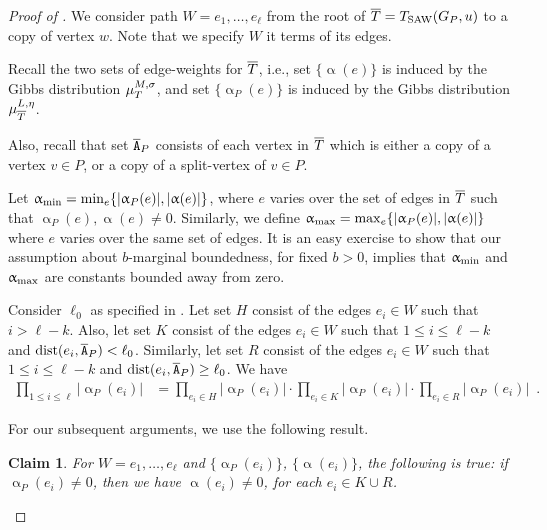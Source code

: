 \documentclass[11pt,reqno]{amsart}
\numberwithin{equation}{section}
\newtheorem{claim}[theorem]{Claim}
\newcommand{\applegreen}[1]{ {\color{applegreen}#1}}
\newcommand{\blue}[1]{{\color{blue}#1}}
\newcommand{\bluepigment}[1]{{\color{blue(pigment)}#1}}
\newcommand{\capri}[1]{{\color{capri}#1}}
\newcommand{\cadmiumorange}[1]{{\color{cadmiumorange}#1}}
\newcommand{\electricviolet}[1]{{\color{electricviolet}#1}}
\newcommand{\goldenbrown}[1]{{\color{goldenbrown}#1}}
\newcommand{\red}[1]{{\color{red}#1}}
\newcommand{\dist}{{\rm dist}}
\newcommand{\Tsaw}{T_{\rm SAW}}
\newcommand{\abs}[1]{\blue{|}#1\blue{|}}
\renewcommand{\applegreen}[1]{#1}
\renewcommand{\blue}[1]{#1}
\renewcommand{\bluepigment}[1]{#1}
\renewcommand{\capri}[1]{#1}
\renewcommand{\cadmiumorange}[1]{#1}
\renewcommand{\electricviolet}[1]{#1}
\renewcommand{\goldenbrown}[1]{#1}
\renewcommand{\red}[1]{#1}
\newcommand{\ke}{\blue{e}}
\newcommand{\ki}{\capri{i}}
\newcommand{\kK}{\bluepigment{K}}
\newcommand{\kk}{\bluepigment{k}}
\newcommand{\kL}{\cadmiumorange{L}}
\newcommand{\kell}{{\color{green(pigment)}\ell}}%
\newcommand{\kP}{\goldenbrown{P}}
\newcommand{\ku}{\red{u}}
\newcommand{\kv}{\electricviolet{v}}
\newcommand{\kW}{\blue{W}}
\newcommand{\kw}{\blue{w}}
\renewcommand{\ke}{e}
\renewcommand{\ki}{i}
\renewcommand{\kK}{K}
\renewcommand{\kk}{k}
\renewcommand{\kL}{L}
\renewcommand{\kell}{\ell}
\renewcommand{\kP}{P}
\renewcommand{\ku}{u}
\renewcommand{\kv}{v}
\renewcommand{\kW}{W}
\renewcommand{\kw}{w}
\newcommand{\infweight}{\upalpha}
\begin{document}
\begin{proof}[Proof of ]
We consider path $\kW=\ke_1,\ldots, \ke_{\kell}$ from the root of $\SMTPu=\Tsaw(\gext{G}{\kP}, \ku)$ to a copy of vertex $\kw$.
Note that we specify $\kW$ it terms of its edges. 


Recall  the two sets of edge-weights for $\overline{T}$, i.e., set  $\{\infweight(\ke)\}$ is induced by the Gibbs distribution $\mu^{M,\sigma}_{\SMTu}$, 
 and set $\{ \infweight_{\kP}(\ke)\}$ is induced by the Gibbs distribution $\mu^{\kL,\eta}_{\SMTPu}$. 



Also, recall that set $\cpTP$ consists of each vertex in $\overline{T}$  which is either a copy of a vertex 
$\kv\in \kP$, or a copy of a split-vertex of $\kv\in \kP$. 
 


Let $\infweight_{\rm min}=\min_{\ke}\{ \abs{\infweight_{\kP} (\ke)}, \abs{{\infweight}(\ke)} \}$,
where $\ke$ varies over the set of edges in $\overline{T}$ such that $ \infweight_{\kP} (\ke), \infweight(\ke)\neq 0$. 
%
Similarly, we define $\infweight_{\rm max}=\max_{\ke}\{\abs{\infweight_{\kP}(\ke)}, \abs{\infweight(\ke)}\}$
where $\ke$ varies  over the same set of edges. 
%
It is an easy exercise to show that our assumption about $b$-marginal boundedness, for fixed $b>0$, 
implies that $\infweight_{\rm min}$ and $\infweight_{\rm max}$ are constants bounded away from zero. 

%
Consider $\ell_0$ as specified in . 
%
Let set $H$ consist of the edges  $\ke_{\ki} \in\kW$ such that $\ki>\kell-\kk$.  Also, let set $\kK$ consist of the edges $\ke_{\ki}\in \kW$ such that 
$1\leq \ki \leq \kell-\kk$ and $\dist(\ke_{\ki}, \cpTP )<\ell_0$. Similarly, let set $R$ consist of the edges $\ke_{\ki}\in \kW$ such 
that $1\leq \ki \leq  \kell-\kk$ and $\dist(\ke_{\ki}, \cpTP )\geq \ell_0$.
%
We have 
\begin{align}
\prod\nolimits_{1\leq i\leq \kell}\abs{\infweight_{\kP}(\ke_{\ki})} &= \prod\nolimits_{\ke_{\ki}\in H}\abs{\infweight_{\kP}(\ke_{\ki})} \cdot
\prod\nolimits_{\ke_{\ki} \in \kK}\abs{\infweight_{\kP}(\ke_{\ki})}
\cdot
\prod\nolimits_{\ke_{\ki} \in R}\abs{\infweight_{\kP}(\ke_{\ki})} \enspace. \label{eq:splitProdHatBetas}
%
\end{align}



For our subsequent arguments, we use the following result. 

\begin{claim}\label{claim:SupportOfWeiS}
For $\kW=\ke_1,\ldots, \ke_{\kell}$ and $\{\infweight_{\kP}(\ke_{\ki})\}$, $\{\infweight(\ke_{\ki})\}$, 
the following is true:  if $\infweight_{\kP}(\ke_{\ki})\neq 0$, then we have $\infweight(\ke_{\ki})\neq 0$, for each $\ke_{\ki}\in \kK\cup R$.
\end{claim}






\end{proof}
\end{document}
